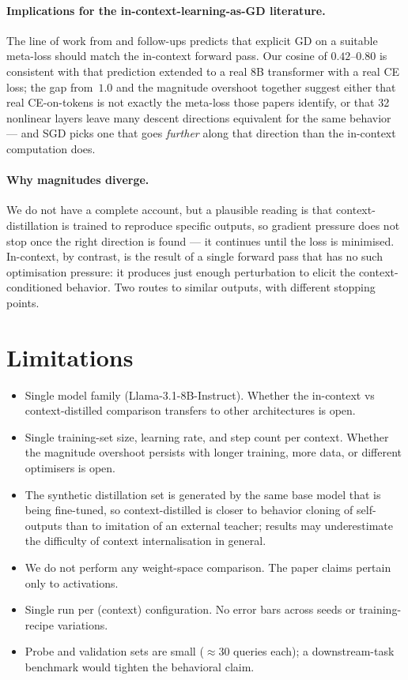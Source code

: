 \documentclass[letterpaper]{article} %
\begin{document}
\paragraph{Implications for the in-context-learning-as-GD literature.}
The line of work from \citet{vonoswald2023transformers} and follow-ups
predicts that explicit GD on a suitable meta-loss should match the
in-context forward pass. Our cosine of $0.42$--$0.80$ is consistent with
that prediction extended to a real 8B transformer with a real CE loss;
the gap from~$1.0$ and the magnitude overshoot together suggest either
that real CE-on-tokens is not exactly the meta-loss those papers
identify, or that 32 nonlinear layers leave many descent directions
equivalent for the same behavior --- and SGD picks one that goes
\emph{further} along that direction than the in-context computation does.

\paragraph{Why magnitudes diverge.}
We do not have a complete account, but a plausible reading is that
context-distillation is trained to reproduce specific outputs, so
gradient pressure does not stop once the right direction is found ---
it continues until the loss is minimised. In-context, by contrast, is
the result of a single forward pass that has no such optimisation
pressure: it produces just enough perturbation to elicit the
context-conditioned behavior. Two routes to similar outputs, with
different stopping points.

\section{Limitations}
\label{sec:limitations}

\begin{itemize}
\item Single model family (Llama-3.1-8B-Instruct). Whether the
  in-context vs context-distilled comparison transfers to other
  architectures is open.
\item Single training-set size, learning rate, and step count per
  context. Whether the magnitude overshoot persists with longer
  training, more data, or different optimisers is open.
\item The synthetic distillation set is generated by the same base
  model that is being fine-tuned, so context-distilled is closer to
  behavior cloning of self-outputs than to imitation of an external
  teacher; results may underestimate the difficulty of context
  internalisation in general.
\item We do not perform any weight-space comparison. The paper claims
  pertain only to activations.
\item Single run per (context) configuration. No error bars across
  seeds or training-recipe variations.
\item Probe and validation sets are small ($\approx 30$ queries
  each); a downstream-task benchmark would tighten the behavioral
  claim.
\end{itemize}



\newpage
\end{document}
